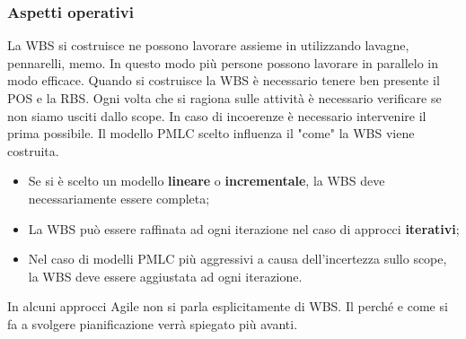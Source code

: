 \subsubsection{Aspetti operativi}
La WBS si costruisce ne possono lavorare assieme in utilizzando lavagne, pennarelli, memo. In questo modo più persone possono lavorare in parallelo in modo efficace.
Quando si costruisce la WBS è necessario tenere ben presente il POS e la RBS. Ogni volta che si ragiona sulle attività è necessario verificare se non siamo usciti dallo scope. In caso di incoerenze è necessario intervenire il prima possibile.\newline
Il modello PMLC scelto influenza il "come" la WBS viene costruita.
\begin{itemize}
	\item Se si è scelto un modello \textbf{lineare} o \textbf{incrementale}, la WBS deve necessariamente essere completa;
	\item La WBS può essere raffinata ad ogni iterazione nel caso di approcci \textbf{iterativi};
	\item Nel caso di modelli PMLC più aggressivi a causa dell'incertezza sullo scope, la WBS deve essere aggiustata ad ogni iterazione.
\end{itemize}
\begin{warn}
	In alcuni approcci Agile non si parla esplicitamente di WBS. Il perché e come si fa a svolgere pianificazione verrà spiegato più avanti.
\end{warn}

